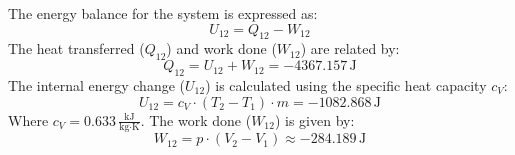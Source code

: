 The energy balance for the system is expressed as:  
\[
U_{12} = Q_{12} - W_{12}
\]  
The heat transferred (\( Q_{12} \)) and work done (\( W_{12} \)) are related by:  
\[
Q_{12} = U_{12} + W_{12} = -4367.157 \, \text{J}
\]  
The internal energy change (\( U_{12} \)) is calculated using the specific heat capacity \( c_V \):  
\[
U_{12} = c_V \cdot (T_2 - T_1) \cdot m = -1082.868 \, \text{J}
\]  
Where \( c_V = 0.633 \, \frac{\text{kJ}}{\text{kg·K}} \).  
The work done (\( W_{12} \)) is given by:  
\[
W_{12} = p \cdot (V_2 - V_1) \approx -284.189 \, \text{J}
\]